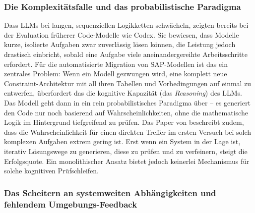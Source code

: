 \subsubsection{Die Komplexitätsfalle und das probabilistische Paradigma}

Dass \ac{LLMs} bei langen, sequenziellen Logikketten schwächeln, zeigten \textcite{chenEvaluatingLargeLanguage2021} bereits bei der Evaluation früherer Code-Modelle wie Codex. Sie bewiesen, dass Modelle kurze, isolierte Aufgaben zwar zuverlässig lösen können, die Leistung jedoch drastisch einbricht, sobald eine Aufgabe viele aneinandergereihte Arbeitsschritte erfordert.  Für die automatisierte Migration von SAP-Modellen ist das ein zentrales Problem: Wenn ein Modell gezwungen wird, eine komplett neue Constraint-Architektur mit all ihren Tabellen und Vorbedingungen auf einmal zu entwerfen, überfordert das die kognitive Kapazität (das \textit{Reasoning}) des \ac{LLMs}. Das Modell geht dann in ein rein probabilistisches Paradigma über – es generiert den Code nur noch basierend auf Wahrscheinlichkeiten, ohne die mathematische Logik im Hintergrund tiefgreifend zu prüfen.  Das Paper von \textcite{chenEvaluatingLargeLanguage2021} beschreibt zudem, dass die Wahrscheinlichkeit für einen direkten Treffer im ersten Versuch bei solch komplexen Aufgaben extrem gering ist. Erst wenn ein System in der Lage ist, iterativ Lösungswege zu generieren, diese zu prüfen und zu verfeinern, steigt die Erfolgsquote. Ein monolithischer Ansatz bietet jedoch keinerlei Mechanismus für solche kognitiven Prüfschleifen.  

\subsubsection{Das Scheitern an systemweiten Abhängigkeiten und fehlendem Umgebungs-Feedback}

